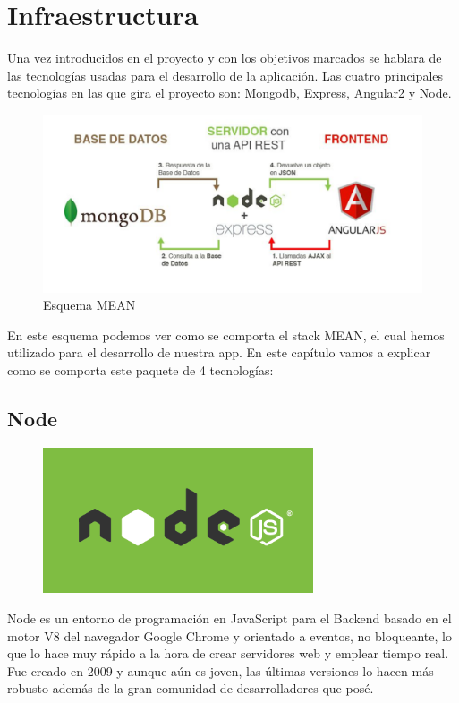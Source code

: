 \chapter{Infraestructura}
Una vez introducidos en el proyecto y con los objetivos marcados se hablara de las tecnologías usadas para el desarrollo de la aplicación. Las cuatro principales tecnologías en las que gira el proyecto son: Mongodb, Express, Angular2 y Node.
\begin{figure}[H]
    \centering
    \includegraphics[width=140mm]{memoria/LaTeX/img/infraestructura/scheme.png}
    \caption{Esquema MEAN}
\end{figure}
En este esquema podemos ver como se comporta el stack MEAN, el cual hemos utilizado para el desarrollo de nuestra app. En este capítulo vamos a explicar como se comporta este paquete de 4 tecnologías: 

\section{Node}

\begin{figure}[H]
    \centering
    \includegraphics[width=80mm]{memoria/LaTeX/img/infraestructura/node.png}

\end{figure}
Node es un entorno de programación en JavaScript para el Backend basado en el motor V8 del navegador Google Chrome y orientado a eventos, no bloqueante, lo que lo hace muy rápido a la hora de crear servidores web y emplear tiempo real. Fue creado en 2009 y aunque aún es joven, las últimas versiones lo hacen más robusto además de la gran comunidad de desarrolladores que posé.


